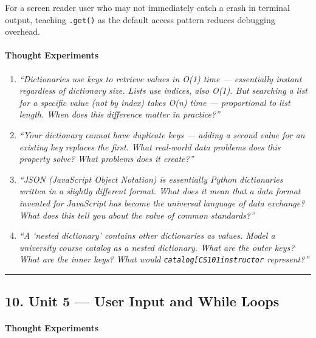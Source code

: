 \documentclass[
  justified,
  openright,
]{tufte-book}
\let\subsubsection\paragraph
\let\paragraph\paragraph
\let\subsubsection\paragraph
\let\paragraph\paragraph
\begin{document}
For a screen reader user who may not immediately catch a crash in
terminal output, teaching \texttt{.get()} as the default access pattern
reduces debugging overhead.

\paragraph{Thought Experiments}\label{thought-experiments-12}

\begin{enumerate}
\def\labelenumi{\arabic{enumi}.}
\item
  \emph{``Dictionaries use keys to retrieve values in O(1) time ---
  essentially instant regardless of dictionary size. Lists use indices,
  also O(1). But searching a list for a specific value (not by index)
  takes O(n) time --- proportional to list length. When does this
  difference matter in practice?''}
\item
  \emph{``Your dictionary cannot have duplicate keys --- adding a second
  value for an existing key replaces the first. What real-world data
  problems does this property solve? What problems does it create?''}
\item
  \emph{``JSON (JavaScript Object Notation) is essentially Python
  dictionaries written in a slightly different format. What does it mean
  that a data format invented for JavaScript has become the universal
  language of data exchange? What does this tell you about the value of
  common standards?''}
\item
  \emph{``A `nested dictionary' contains other dictionaries as values.
  Model a university course catalog as a nested dictionary. What are the
  outer keys? What are the inner keys? What would
  \texttt{catalog{[}\textquotesingle{}CS\textquotesingle{}{]}{[}\textquotesingle{}101\textquotesingle{}{]}{[}\textquotesingle{}instructor\textquotesingle{}{]}}
  represent?''}
\end{enumerate}

\begin{center}\rule{0.5\linewidth}{0.5pt}\end{center}

\subsection{10. Unit 5 --- User Input and While
Loops}\label{unit-5-user-input-and-while-loops}

\subsubsection{Thought Experiments}\label{thought-experiments-13}
\end{document}
